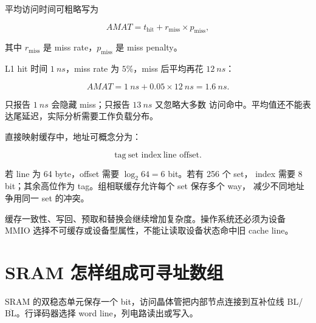 平均访问时间可粗略写为

\[
AMAT=t_{\mathrm{hit}}
+r_{\mathrm{miss}}\times p_{\mathrm{miss}},
\]

其中 \(r_{\mathrm{miss}}\) 是 miss rate，\(p_{\mathrm{miss}}\) 是 miss penalty。

\begin{workedexample}
L1 hit 时间 \(\SI{1}{ns}\)，miss rate 为 \(5\%\)，miss 后平均再花
\(\SI{12}{ns}\)：

\[
AMAT=\SI{1}{ns}+0.05\times\SI{12}{ns}
=\SI{1.6}{ns}.
\]

只报告 \(\SI{1}{ns}\) 会隐藏 miss；只报告 \(\SI{13}{ns}\) 又忽略大多数
访问命中。平均值还不能表达尾延迟，实际分析需要工作负载分布。
\end{workedexample}

直接映射缓存中，地址可概念分为：

\[
\boxed{\text{tag}}\ \boxed{\text{set index}}\ \boxed{\text{line offset}}.
\]

若 line 为 64 byte，offset 需要 \(\log_2 64=6\) bit。若有 256 个 set，
index 需要 8 bit；其余高位作为 tag。组相联缓存允许每个 set 保存多个 way，
减少不同地址争用同一 set 的冲突。

\begin{center}
\end{center}

缓存一致性、写回、预取和替换会继续增加复杂度。操作系统还必须为设备 MMIO
选择不可缓存或设备型属性，不能让读取设备状态命中旧 cache line。

\section{SRAM 怎样组成可寻址数组}
SRAM 的双稳态单元保存一个 bit，访问晶体管把内部节点连接到互补位线
BL/\(\overline{\mathrm{BL}}\)。行译码器选择 word line，列电路读出或写入。

